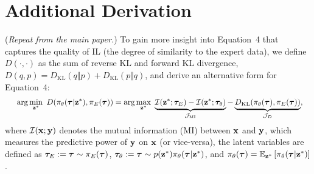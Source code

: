

\section{Additional Derivation}
\label{app:sec:additional-derivation} 



(\textit{Repeat from the main paper.}) To gain more insight into Equation~4 that captures the quality of IL (the degree of similarity to the expert data), we define $D(\cdot, \cdot)$ as the sum of reverse KL and forward KL divergence, \ie $D(q, p) = D_\text{KL}(q\Vert p) + D_\text{KL}(p\Vert q)$, and derive an alternative form for Equation~4: 
\begin{align}
	&\ \quad \arg \min_{{\mathbf{z}}^*} \ D(\pi_\theta({\bm{\tau}}|{\mathbf{z}}^*), \pi_E({\bm{\tau}})) 
	= \arg \max_{{\mathbf{z}}^*} \ \underbrace{\mathcal{I}({\mathbf{z}}^*; {\bm{\tau}}_E) - \mathcal{I}({\mathbf{z}}^*; {\bm{\tau}}_\theta)}_{\mathcal{J}_\text{MI}}
	- \underbrace{D_\text{KL}(\pi_\theta({\bm{\tau}}), \pi_E({\bm{\tau}}))}_{\mathcal{J}_{D}}, \nonumber
\end{align}
where $\mathcal{I}(\mathbf{x};\mathbf{y})$ denotes the mutual information (MI) between $\mathbf{x}$ and $\mathbf{y}$, which measures the predictive power of $\mathbf{y}$ on $\mathbf{x}$ (or vice-versa), 
the latent variables are defined as ${\bm{\tau}}_E:={\bm{\tau}} \sim \pi_E({\bm{\tau}})$, ${\bm{\tau}}_\theta:={\bm{\tau}} \sim p({\mathbf{z}}^*)\pi_\theta({\bm{\tau}}|{\mathbf{z}}^*)$, and $\pi_\theta({\bm{\tau}})=\mathbb{E}_{{\mathbf{z}}^*}\left[ \pi_\theta({\bm{\tau}}|{\mathbf{z}}^*) \right]$. 



